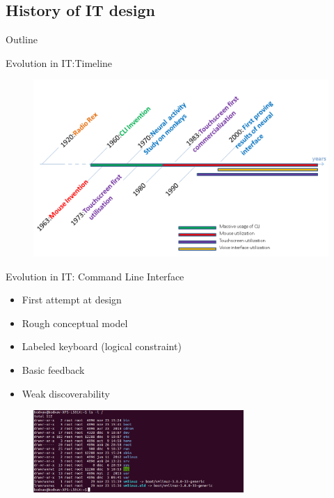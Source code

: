 \documentclass{beamer}
\begin{document}
\subsection{History of IT design}

\begin{frame}{Outline}
\end{frame}

\begin{frame}{Evolution in IT:Timeline}
\begin{figure}
\centering
\includegraphics[scale=0.3]{timeline-interface_2.png}
\end{figure}
\end{frame}

\begin{frame}{Evolution in IT: Command Line Interface}

\begin{itemize}
\item First attempt at design
\item Rough conceptual model
\item Labeled keyboard (logical constraint)
\item Basic feedback
\item Weak discoverability
\end{itemize}
	\begin{figure}
			  \begin{minipage}{5cm}
				  \includegraphics[width=8cm]{terminal.png}
			  \end{minipage}

		\end{figure}
\end{frame}
\end{document}
